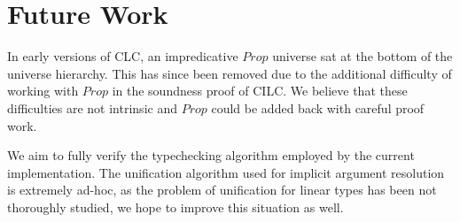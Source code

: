 \documentclass[sigplan,screen,review,anonymous]{acmart}
\begin{document}
\section{Future Work}
In early versions of CLC, an impredicative $Prop$ universe sat at the bottom of the universe hierarchy. This has since been removed due to the additional difficulty of working with $Prop$ in the soundness proof of CILC. We believe that these difficulties are not intrinsic and $Prop$ could be added back with careful proof work.

We aim to fully verify the typechecking algorithm employed by the current implementation. The unification algorithm used for implicit argument resolution is extremely ad-hoc, as the problem of unification for linear types has been not thoroughly studied, we hope to improve this situation as well.




\end{document}
